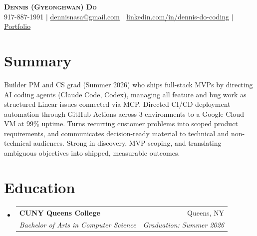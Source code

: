 \documentclass[letterpaper,10pt]{article}
\makeatletter
\newcommand{\resumeSubheading}[4]{
  \vspace{-2pt}\item
    \begin{tabular*}{0.97\textwidth}[t]{l@{\extracolsep{\fill}}r}
      \textbf{#1} & #2 \\
      \textit{\small#3} & \textit{\small #4} \\
    \end{tabular*}\vspace{-6pt}
}
\newcommand{\resumeSubHeadingListStart}{\begin{itemize}[leftmargin=0.15in, label={}]}
\newcommand{\resumeSubHeadingListEnd}{\end{itemize}}
\makeatother
\begin{document}
\begin{center}
    \textbf{\Huge \scshape Dennis (Gyeonghwan) Do} \\ \vspace{1pt}
    \small 917-887-1991 $|$ \href{mailto:dennisnasa@gmail.com}{dennisnasa@gmail.com} $|$
    \href{https://linkedin.com/in/dennis-do-coding}{linkedin.com/in/dennis-do-coding} $|$
    \href{https://personal-portfolio-bice-pi.vercel.app/}{Portfolio}
\end{center}

\section{Summary}
\vspace{1pt}
\small{Builder PM and CS grad (Summer 2026) who ships full-stack MVPs by directing AI coding agents (Claude Code, Codex), managing all feature and bug work as structured Linear issues connected via MCP. Directed CI/CD deployment automation through GitHub Actions across 3 environments to a Google Cloud VM at 99\% uptime. Turns recurring customer problems into scoped product requirements, and communicates decision-ready material to technical and non-technical audiences. Strong in discovery, MVP scoping, and translating ambiguous objectives into shipped, measurable outcomes.}
\vspace{-6pt}

\section{Education}
  \resumeSubHeadingListStart
    \resumeSubheading
      {CUNY Queens College}{Queens, NY}
      {Bachelor of Arts in Computer Science}{Graduation: Summer 2026}
  \resumeSubHeadingListEnd

\end{document}
